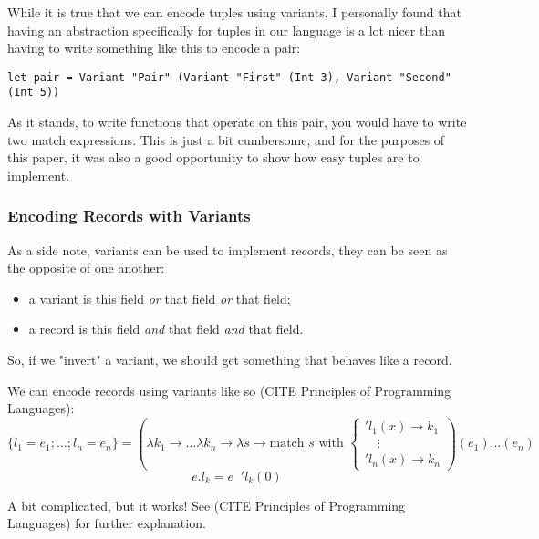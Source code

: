 While it is true that we can encode tuples using variants, I personally found that having
an abstraction specifically for tuples in our language is a lot nicer than having to write something like this
to encode a pair:

\begin{lstlisting}
let pair = Variant "Pair" (Variant "First" (Int 3), Variant "Second" (Int 5))
\end{lstlisting}

As it stands, to write functions that operate on this pair, you would have to write two match expressions.
This is just a bit cumbersome, and for the purposes of this paper, it was also a good opportunity to show how easy
tuples are to implement.

\subsubsection{Encoding Records with Variants}

As a side note, variants can be used to implement records, they can be seen as the opposite of one another: 
\begin{itemize}
  \item a variant is this field \textit{or} that field \textit{or} that field;
  \item a record is this field \textit{and} that field \textit{and} that field.
\end{itemize}

So, if we "invert" a variant, we should get something that behaves like a record.

We can encode records using variants like so (CITE Principles of Programming Languages):
\[
\{l_1 = e_1; \dots; l_n = e_n\} = 
(\lambda k_1 \to \dots \lambda k_n \to \lambda s \to 
\text{match } s \text{ with } 
\begin{cases}
    'l_1(x) \to k_1 \\
    \quad \vdots \quad \\
    'l_n(x) \to k_n
\end{cases}
)(e_1) \dots (e_n)
\]
\[
e.l_k = e \;\; 'l_k(0)
\]

A bit complicated, but it works! See (CITE Principles of Programming Languages) for further explanation.
